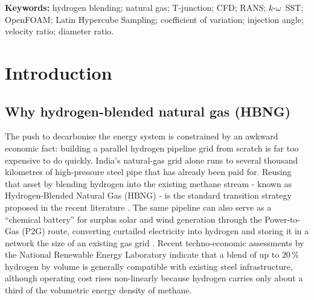 \documentclass[11pt,a4paper]{article}
\begin{document}
\vspace{1em}
\noindent
\textbf{Keywords:} hydrogen blending; natural gas; T-junction; CFD;
RANS; \(k\)-\(\omega\)~SST; OpenFOAM; Latin Hypercube Sampling;
coefficient of variation; injection angle; velocity ratio;
diameter ratio.

\clearpage

\tableofcontents
\clearpage

\section{Introduction}
\label{sec:intro}

\subsection{Why hydrogen-blended natural gas (HBNG)}
The push to decarbonise the energy system is constrained by an
awkward economic fact: building a parallel hydrogen pipeline grid
from scratch is far too expensive to do quickly. India's natural-gas
grid alone runs to several thousand kilometres of high-pressure steel
pipe that has already been paid for. Reusing that asset by blending
hydrogen into the existing methane stream - known as
Hydrogen-Blended Natural Gas (HBNG) - is the standard transition
strategy proposed in the recent literature
\citep{su2022prediction,arya2023multi,montanes2024comprehensive}.
The same pipeline can also serve as a ``chemical battery'' for
surplus solar and wind generation through the Power-to-Gas (P2G)
route, converting curtailed electricity into hydrogen and storing it
in a network the size of an existing gas grid \citep{arya2023multi}.
Recent techno-economic assessments by the National Renewable Energy
Laboratory \citep{topolski2022blending} indicate that a blend of up to
\(20\,\%\) hydrogen by volume is generally compatible with existing
steel infrastructure, although operating cost rises non-linearly
because hydrogen carries only about a third of the volumetric energy
density of methane.
\end{document}
